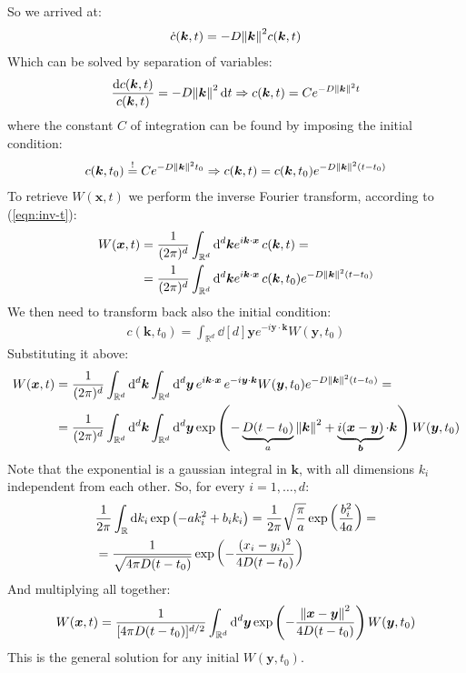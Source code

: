 \documentclass[../template.tex]{subfiles}
\begin{document}
\begin{exo}
    So we arrived at:
    \begin{align*}
        \dot{c}(\bm{k},t) = -D\norm{\bm{k}}^2 c(\bm{k},t)
    \end{align*}
    Which can be solved by separation of variables:
    \begin{align*}
        \frac{\dd{c(\bm{k},t)}}{c(\bm{k},t)}  = -D \norm{\bm{k}}^2 \dd{t} \Rightarrow c(\bm{k},t) = C e^{-D \norm{\bm{k}}^2 t}
    \end{align*}
    where the constant $C$ of integration can be found by imposing the initial condition:
    \begin{align*}
        c(\bm{k},t_0) \overset{!}{=} C e^{-D \norm{\bm{k}}^2 t_0} \Rightarrow c(\bm{k},t) = c(\bm{k},t_0) e^{-D \norm{\bm{k}}^2 (t-t_0)}
    \end{align*}
    To retrieve $W(\bm{x},t)$ we perform the inverse Fourier transform, according to (\ref{eqn:inv-t}):
    \begin{align*}
        W(\bm{x},t) &= \frac{1}{(2 \pi)^d} \int_{\mathbb{R}^d} \dd[d]{\bm{k} e^{i\bm{k}\cdot \bm{x}}} c(\bm{k},t) =\\
        &=\frac{1}{(2 \pi)^d} \int_{\mathbb{R}^d} \dd[d]{\bm{k} e^{i\bm{k}\cdot \bm{x}}} c(\bm{k},t_0) e^{-D \norm{\bm{k}}^2 (t-t_0)}
    \end{align*}
    We then need to transform back also the initial condition:
    \begin{align*}
        c(\bm{k},t_0) = \int_{\mathbb{R}^d} \dd[d]{\bm{y}} e^{-i\bm{y} \cdot \bm{k}} W(\bm{y},t_0)
    \end{align*}
    Substituting it above:
    \begin{align*}
        W(\bm{x},t) &= \frac{1}{(2 \pi)^d} \int_{\mathbb{R}^d} \dd[d]{\bm{k}\int_{\mathbb{R}^d} \dd[d]{\bm{y}}  e^{i\bm{k}\cdot \bm{x}}} e^{-i\bm{y} \cdot \bm{k}} W(\bm{y},t_0) e^{-D \norm{\bm{k}}^2 (t-t_0)} =\\
        &= \frac{1}{(2 \pi)^d} \int_{\mathbb{R}^d} \dd[d]{\bm{k}\int_{\mathbb{R}^d} \dd[d]{\bm{y}}  } \exp\left(-\underbrace{D (t-t_0) }_{a}\norm{\bm{k}}^2+ \underbrace{i (\bm{x} - \bm{y})}_{\bm{b}} \cdot\bm{k} \right) W(\bm{y},t_0)
    \end{align*}
    Note that the exponential is a gaussian integral in $\bm{k}$, with all dimensions $k_i$ independent from each other. So, for every $i = 1,\dots,d$:
    \begin{align*}
        \frac{1}{2 \pi} \int_{\mathbb{R}} \dd{k_i} \exp\left(-a k_i^2 + b_i k_i\right) = \frac{1}{2 \pi} \sqrt{\frac{\pi}{a} } \exp\left(\frac{b^2_i}{4a} \right) = \span \\
        &= \frac{1}{\sqrt{4 \pi D (t-t_0)}} \exp\left(-\frac{(x_i-y_i)^2}{4 D (t-t_0)} \right)
    \end{align*}
    And multiplying all together:
    \begin{align*}
        W(\bm{x},t) = \frac{1}{[4 \pi D(t-t_0)]^{d/2}} \int_{\mathbb{R}^d} \dd[d]{\bm{y}} \exp\left(-\frac{\norm{\bm{x} - \bm{y}}^2}{4 D (t-t_0)} \right) W(\bm{y},t_0)
    \end{align*}
    This is the general solution for any initial $W(\bm{y},t_0)$.


\end{exo}
\end{document}

